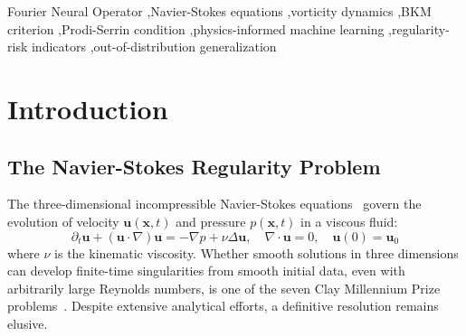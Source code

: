\documentclass[review]{elsarticle}
\begin{document}
\begin{frontmatter}
\begin{abstract}
An ablation over seven physics-loss configurations yields tightly clustered in-distribution
validation losses ($0.0093 \pm 0.00005$): on genuine data the multi-physics constraints act
primarily as regularity-informed regularizers whose principal value is an online
\emph{regularity-risk indicator}---on synthetic contracting-vortex versus decaying scenarios
the BKM integral separates by 11.4$\times$, a controlled discrimination result rather than a
claim of singularity detection.

We further quantify FNO \emph{resolution-independence}: a $64^3$ variant over eight
independent seeds matches the $32^3$ baseline on both real-DNS and $64^3$-grid OOD
benchmarks (within 0.005), identifying spectral mode truncation---not grid resolution---as
the effective capacity bottleneck; capitalizing on this, mixed-resolution ($32^3{+}64^3$)
training yields a 12\% in-distribution gain with no OOD regression. To our knowledge this is
the first systematic study to jointly integrate these six criteria at the discrete level with
an exhaustive single-removal ablation, alongside a genuine-DNS, four-dimensional OOD
benchmark.
\end{abstract}

\begin{keyword}
Fourier Neural Operator \sep Navier-Stokes equations \sep vorticity dynamics \sep BKM criterion \sep Prodi-Serrin condition \sep physics-informed machine learning \sep regularity-risk indicators \sep out-of-distribution generalization
\end{keyword}

\end{frontmatter}

\section{Introduction}
\label{sec:intro}

\subsection{The Navier-Stokes Regularity Problem}
\label{sec:ns-problem}

The three-dimensional incompressible Navier-Stokes equations~\cite{majda2001vorticity,doering1995applied} govern the evolution of velocity $\bm{u}(\bm{x}, t)$ and pressure $p(\bm{x}, t)$ in a viscous fluid:
\begin{equation}
\partial_t \bm{u} + (\bm{u} \cdot \nabla) \bm{u} = -\nabla p + \nu \Delta \bm{u}, \quad \nabla \cdot \bm{u} = 0, \quad \bm{u}(0) = \bm{u}_0
\label{eq:ns}
\end{equation}
where $\nu$ is the kinematic viscosity. Whether smooth solutions in three dimensions can develop finite-time singularities from smooth initial data, even with arbitrarily large Reynolds numbers, is one of the seven Clay Millennium Prize problems~\cite{lax1973hyperbolic,butcher2016numerical}. Despite extensive analytical efforts, a definitive resolution remains elusive.
\end{document}
